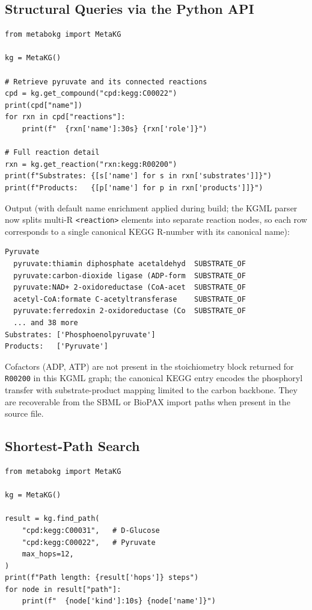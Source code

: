 \documentclass[10pt]{article}
\begin{document}
\subsection{Structural Queries via the Python API}

\begin{lstlisting}[style=python, caption={Compound retrieval and neighbourhood traversal.}]
from metabokg import MetaKG

kg = MetaKG()

# Retrieve pyruvate and its connected reactions
cpd = kg.get_compound("cpd:kegg:C00022")
print(cpd["name"])
for rxn in cpd["reactions"]:
    print(f"  {rxn['name']:30s} {rxn['role']}")

# Full reaction detail
rxn = kg.get_reaction("rxn:kegg:R00200")
print(f"Substrates: {[s['name'] for s in rxn['substrates']]}")
print(f"Products:   {[p['name'] for p in rxn['products']]}")
\end{lstlisting}

Output (with default name enrichment applied during build; the KGML parser
now splits multi-R \texttt{<reaction>} elements into separate reaction nodes,
so each row corresponds to a single canonical KEGG R-number with its
canonical name):
\begin{lstlisting}[style=bash, caption={}]
Pyruvate
  pyruvate:thiamin diphosphate acetaldehyd  SUBSTRATE_OF
  pyruvate:carbon-dioxide ligase (ADP-form  SUBSTRATE_OF
  pyruvate:NAD+ 2-oxidoreductase (CoA-acet  SUBSTRATE_OF
  acetyl-CoA:formate C-acetyltransferase    SUBSTRATE_OF
  pyruvate:ferredoxin 2-oxidoreductase (Co  SUBSTRATE_OF
  ... and 38 more
Substrates: ['Phosphoenolpyruvate']
Products:   ['Pyruvate']
\end{lstlisting}

Cofactors (ADP, ATP) are not present in the stoichiometry block returned for
\texttt{R00200} in this KGML graph; the canonical KEGG entry encodes the
phosphoryl transfer with substrate-product mapping limited to the carbon
backbone. They are recoverable from the SBML or BioPAX import paths when
present in the source file.

\subsection{Shortest-Path Search}

\begin{lstlisting}[style=python, caption={Finding the shortest metabolic route between two compounds.}]
from metabokg import MetaKG

kg = MetaKG()

result = kg.find_path(
    "cpd:kegg:C00031",   # D-Glucose
    "cpd:kegg:C00022",   # Pyruvate
    max_hops=12,
)
print(f"Path length: {result['hops']} steps")
for node in result["path"]:
    print(f"  {node['kind']:10s} {node['name']}")
\end{lstlisting}
\end{document}

